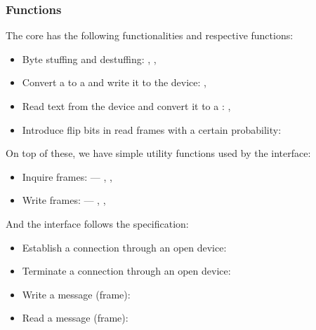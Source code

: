 \documentclass[main.tex]{subfiles}
\begin{document}
\subsubsection{Functions}
\label{subsubsec:funcllarch}

The core has the following functionalities and respective functions:

\begin{itemize}[noitemsep,rightmargin=3em]
\item Byte stuffing and destuffing:
, , 

\item Convert a  to a  and write it to the device:
, 

\item Read text from the device and convert it to a :
, 

\item Introduce flip bits in read frames with a certain probability: 
\end{itemize}

On top of these, we have simple utility functions used by the interface:

\begin{itemize}[noitemsep,rightmargin=3em]
\item Inquire frames:  ---
, , \textellipsis

\item Write frames:  ---
, , \textellipsis
\end{itemize}

And the interface follows the specification:

\begin{itemize}[noitemsep,rightmargin=3em]
\item Establish a connection through an open device:

\item Terminate a connection through an open device:

\item Write a message (frame):

\item Read a message (frame):
\end{itemize}
\end{document}

